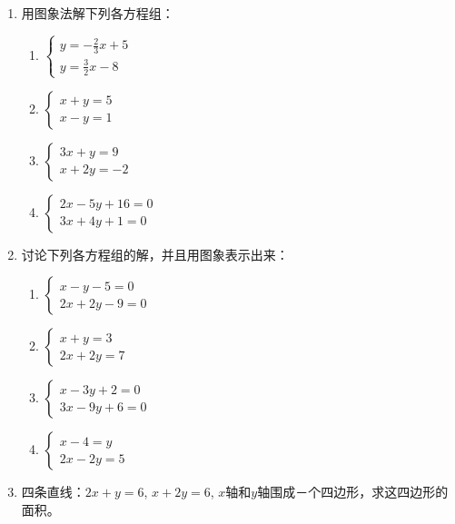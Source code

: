 \begin{enumerate}
\item     用图象法解下列各方程组：
  \begin{multicols}{2}
\begin{enumerate}
    \item $\begin{cases}
        y=-\frac{2}{3}x+5\\
        y=\frac{3}{2}x-8
    \end{cases}$
    \item $\begin{cases}
        x+y=5\\x-y=1
    \end{cases}$
    \item $\begin{cases}
        3x+y=9\\x+2y=-2
    \end{cases}$
    \item $\begin{cases}
        2x-5y+16=0\\3x+4y+1=0
    \end{cases}$
\end{enumerate}
\end{multicols}
    \item 讨论下列各方程组的解，并且用图象表示出来：
    \begin{multicols}{2}
        \begin{enumerate}
\item $\begin{cases}
    x-y-5=0\\2x+2y-9=0
\end{cases}$    
\item $\begin{cases}
     x+y=3\\2x+2y=7
\end{cases}$ 
\item $\begin{cases}
    x-3y+2=0\\3x-9y+6=0
\end{cases}$ 
\item $\begin{cases}
    x-4=y\\2x-2y=5
\end{cases}$ 
        \end{enumerate}
\end{multicols}
   
\item 四条直线：$2x+y=6$, $x+2y=6$, $x$轴和$y$轴围成－个四边形，求这四边形的面积。

\end{enumerate}

